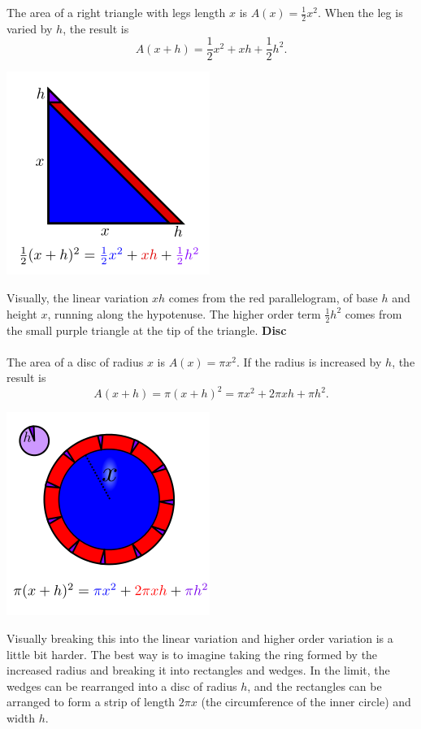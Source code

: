 \documentclass[twoside,openright,titlepage,a4paper]{book}
\begin{document}
\begin{sloppypar}
The area of a right triangle with legs length $x$ is $A(x) = \frac{1}{2}x^2$. When the leg is varied by $h$, the result is \[ A(x+h) = \frac{1}{2}x^2 + xh + \frac{1}{2}h^2. \]
\begin{center}\includegraphics[scale=0.6]{TriangleVariation}\end{center}

Visually, the linear variation $xh$ comes from the red parallelogram, of base $h$ and height $x$, running along the hypotenuse. The higher order term $\frac{1}{2}h^2$ comes from the small purple triangle at the tip of the triangle.
\bigbreak
\noindent \textbf{Disc}\\\\

The area of a disc of radius $x$ is $A(x) = \pi x^2$. If the radius is increased by $h$, the result is \[ A(x+h) = \pi (x+h)^2 = \pi x^2 + 2\pi x h + \pi h^2. \]
\begin{center}\includegraphics[scale=0.6]{CircleVariation}\end{center}

Visually breaking this into the linear variation and higher order variation is a little bit harder. The best way is to imagine taking the ring formed by the increased radius and breaking it into rectangles and wedges. In the limit, the wedges can be rearranged into a disc of radius $h$, and the rectangles can be arranged to form a strip of length $2\pi x$ (the circumference of the inner circle) and width $h$.


\end{sloppypar}
\end{document}
